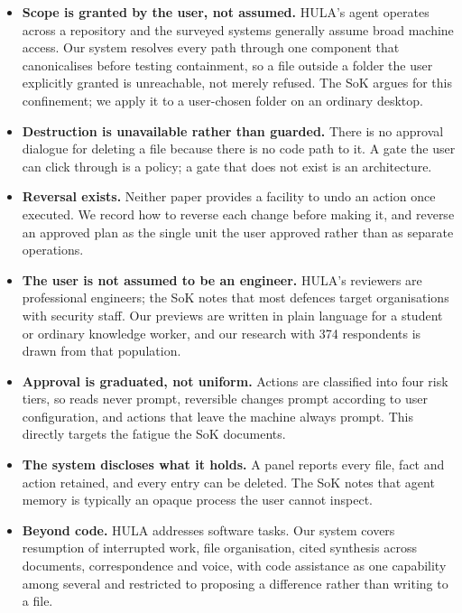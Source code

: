 \documentclass[11pt,a4paper]{article}
\begin{document}
\begin{itemize}
  \item \textbf{Scope is granted by the user, not assumed.} HULA's agent
        operates across a repository and the surveyed systems generally assume
        broad machine access. Our system resolves every path through one
        component that canonicalises before testing containment, so a file
        outside a folder the user explicitly granted is unreachable, not merely
        refused. The SoK argues for this confinement; we apply it to a
        user-chosen folder on an ordinary desktop.
  \item \textbf{Destruction is unavailable rather than guarded.} There is no
        approval dialogue for deleting a file because there is no code path to
        it. A gate the user can click through is a policy; a gate that does not
        exist is an architecture.
  \item \textbf{Reversal exists.} Neither paper provides a facility to undo an
        action once executed. We record how to reverse each change before
        making it, and reverse an approved plan as the single unit the user
        approved rather than as separate operations.
  \item \textbf{The user is not assumed to be an engineer.} HULA's reviewers
        are professional engineers; the SoK notes that most defences target
        organisations with security staff. Our previews are written in plain
        language for a student or ordinary knowledge worker, and our research
        with 374 respondents is drawn from that population.
  \item \textbf{Approval is graduated, not uniform.} Actions are classified into
        four risk tiers, so reads never prompt, reversible changes prompt
        according to user configuration, and actions that leave the machine
        always prompt. This directly targets the fatigue the SoK documents.
  \item \textbf{The system discloses what it holds.} A panel reports every
        file, fact and action retained, and every entry can be deleted. The SoK
        notes that agent memory is typically an opaque process the user cannot
        inspect.
  \item \textbf{Beyond code.} HULA addresses software tasks. Our system covers
        resumption of interrupted work, file organisation, cited synthesis
        across documents, correspondence and voice, with code assistance as one
        capability among several and restricted to proposing a difference
        rather than writing to a file.
\end{itemize}
\end{document}

